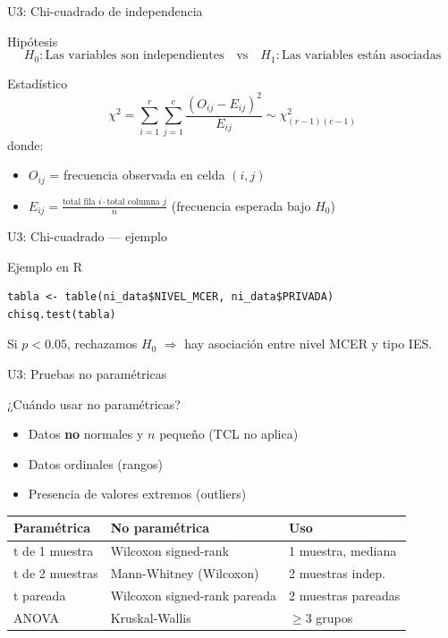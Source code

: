 \documentclass[aspectratio=169, 11pt]{beamer}
\begin{document}
\begin{frame}[fragile]{U3: Chi-cuadrado de independencia}
\begin{block}{Hipótesis}
$$H_0: \text{Las variables son independientes} \quad \text{vs} \quad H_1: \text{Las variables están asociadas}$$
\end{block}

\begin{block}{Estadístico}
$$\chi^2 = \sum_{i=1}^{r}\sum_{j=1}^{c} \frac{(O_{ij} - E_{ij})^2}{E_{ij}} \sim \chi^2_{(r-1)(c-1)}$$
donde:
\begin{itemize}
\item $O_{ij}$ = frecuencia observada en celda $(i,j)$
\item $E_{ij} = \frac{\text{total fila } i \cdot \text{total columna } j}{n}$ (frecuencia esperada bajo $H_0$)
\end{itemize}
\end{block}
\end{frame}

\begin{frame}[fragile]{U3: Chi-cuadrado --- ejemplo}
\begin{exampleblock}{Ejemplo en R}
\begin{lstlisting}
tabla <- table(ni_data$NIVEL_MCER, ni_data$PRIVADA)
chisq.test(tabla)
\end{lstlisting}
Si $p < 0.05$, rechazamos $H_0$ $\Rightarrow$ hay asociación entre nivel MCER y tipo IES.
\end{exampleblock}
\end{frame}

\begin{frame}[fragile]{U3: Pruebas no paramétricas}
\begin{block}{¿Cuándo usar no paramétricas?}
\begin{itemize}
\item Datos \textbf{no} normales y $n$ pequeño (TCL no aplica)
\item Datos ordinales (rangos)
\item Presencia de valores extremos (outliers)
\end{itemize}
\end{block}

\begin{center}
\small
\renewcommand{\arraystretch}{1.2}
\begin{tabular}{lll}
\toprule
\textbf{Paramétrica} & \textbf{No paramétrica} & \textbf{Uso} \\
\midrule
t de 1 muestra & Wilcoxon signed-rank & 1 muestra, mediana \\
t de 2 muestras & Mann-Whitney (Wilcoxon) & 2 muestras indep. \\
t pareada & Wilcoxon signed-rank pareada & 2 muestras pareadas \\
ANOVA & Kruskal-Wallis & $\geq 3$ grupos \\
\bottomrule
\end{tabular}
\end{center}
\end{frame}
\end{document}
